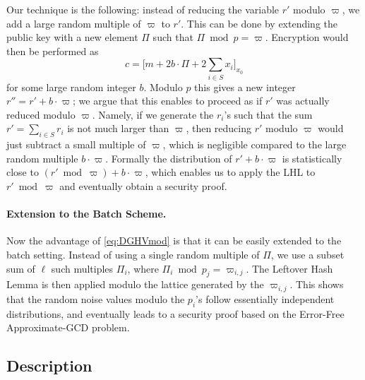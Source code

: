 \documentclass[11pt]{llncs}
\begin{document}
Our technique is the following: instead of reducing the variable $r'$
modulo $\varpi$, we add a large random multiple of $\varpi$ to $r'$. This
can be done by extending the public key with a new element $\varPi$ such
that $\varPi \bmod p=\varpi$. Encryption would then be performed as
\begin{equation}
\label{eq:DGHVmod}
c = \Big[m + 2b \cdot \varPi+
  2\sum\limits_{i\in S} x_i\Big]_{x_0}
\end{equation}
for some large random integer $b$. Modulo $p$ this gives a new integer
$r''=r' + b \cdot \varpi$; we argue that this enables to proceed as if
$r'$ was actually reduced modulo $\varpi$. Namely, if we generate the
$r_i$'s such that the sum $r'=\sum_{i \in S} r_i$ is not much larger than
$\varpi$, then reducing $r'$ modulo $\varpi$ would just subtract a
small multiple of $\varpi$, which is negligible compared to the large
random multiple $b \cdot \varpi$. Formally  the distribution of $r' + b
\cdot \varpi$ is statistically close to $(r' \bmod \varpi) + b \cdot
\varpi$, which enables us to apply the LHL to $r' \bmod \varpi$ and
eventually obtain a security proof.

\paragraph{Extension to the Batch Scheme.} Now the advantage of \eqref{eq:DGHVmod} is that it can be easily extended
to the batch setting. Instead of using a single random multiple of
$\varPi$, we use a subset sum of $\ell$ such multiples $\varPi_i$, where
$\varPi_i \bmod p_j=\varpi_{i,j}$. The Leftover Hash Lemma is then
applied modulo the lattice generated by the $\varpi_{i,j}$. This shows
that the random noise values modulo the $p_i$'s follow essentially
independent distributions, and eventually leads to a security proof based on the Error-Free Approximate-GCD problem. 

\subsection{Description}\label{subsec:description}
\end{document}
